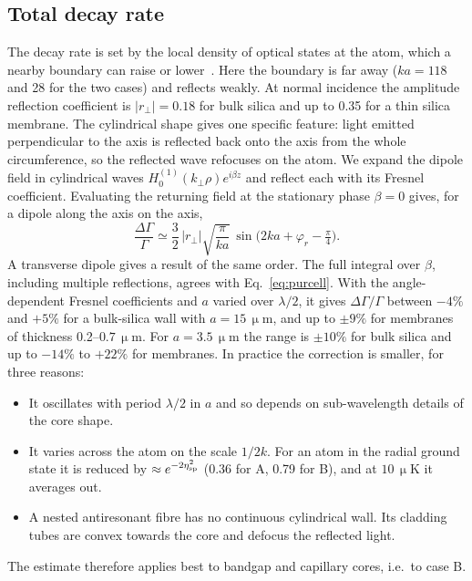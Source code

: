 \documentclass[11pt,a4paper]{article}
\newcommand{\micrometre}{\upmu m}\newcommand{\microkelvin}{\upmu K}
\newcommand{\SI}[2]{\ensuremath{#1\,\mathrm{#2}}}
\begin{document}
\subsection{Total decay rate}
The decay rate is set by the local density of optical states at the atom, which a nearby boundary can raise or lower~\cite{kleppner1981}. Here the boundary is far away ($ka=118$ and 28 for the two cases) and reflects weakly. At normal incidence the amplitude reflection coefficient is $|r_\perp|=0.18$ for bulk silica and up to 0.35 for a thin silica membrane. The cylindrical shape gives one specific feature: light emitted perpendicular to the axis is reflected back onto the axis from the whole circumference, so the reflected wave refocuses on the atom. We expand the dipole field in cylindrical waves $H_0^{(1)}(k_\perp\rho)e^{i\beta z}$ and reflect each with its Fresnel coefficient. Evaluating the returning field at the stationary phase $\beta=0$ gives, for a dipole along the axis on the axis,
\begin{equation}
  \frac{\Delta\Gamma}{\Gamma}\simeq\frac32\,|r_\perp|\sqrt{\frac{\pi}{ka}}\,
  \sin\!\big(2ka+\varphi_r-\tfrac{\pi}{4}\big).
  \label{eq:purcell}
\end{equation}
A transverse dipole gives a result of the same order. The full integral over $\beta$, including multiple reflections, agrees with Eq.~\eqref{eq:purcell}. With the angle-dependent Fresnel coefficients and $a$ varied over $\lambda/2$, it gives $\Delta\Gamma/\Gamma$ between $-4\%$ and $+5\%$ for a bulk-silica wall with $a=\SI{15}{\micrometre}$, and up to $\pm9\%$ for membranes of thickness 0.2--\SI{0.7}{\micrometre}. For $a=\SI{3.5}{\micrometre}$ the range is $\pm10\%$ for bulk silica and up to $-14\%$ to $+22\%$ for membranes. In practice the correction is smaller, for three reasons:
\begin{itemize}
\item It oscillates with period $\lambda/2$ in $a$ and so depends on sub-wavelength details of the core shape.
\item It varies across the atom on the scale $1/2k$. For an atom in the radial ground state it is reduced by $\approx e^{-2\eta_{\rm sp}^2}$ (0.36 for A, 0.79 for B), and at \SI{10}{\microkelvin} it averages out.
\item A nested antiresonant fibre has no continuous cylindrical wall. Its cladding tubes are convex towards the core and defocus the reflected light.
\end{itemize}
The estimate therefore applies best to bandgap and capillary cores, i.e.\ to case B.
\end{document}
